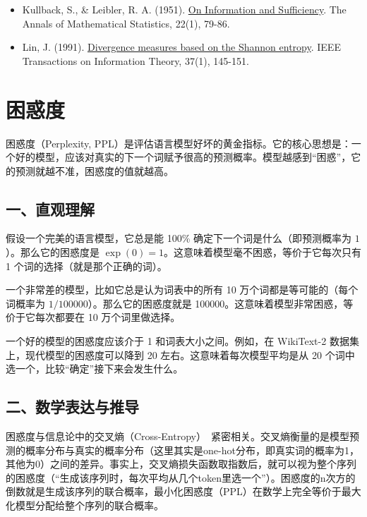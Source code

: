 \vspace{0.25em}
\begin{itemize}
\tightlist
\item
  Kullback, S., \& Leibler, R. A. (1951). \href{https://doi.org/10.1214/aoms/1177729694}{On Information and Sufficiency}. The Annals of Mathematical Statistics, 22(1), 79-86.
\item
  Lin, J. (1991). \href{https://doi.org/10.1109/18.61115}{Divergence measures based on the Shannon entropy}. IEEE Transactions on Information Theory, 37(1), 145-151.
\end{itemize}

\clearpage

\hypertarget{ux56f0ux60d1ux5ea6}{%
\section{困惑度}\label{ux56f0ux60d1ux5ea6}}

困惑度（Perplexity, PPL）是评估语言模型好坏的黄金指标。它的核心思想是：一个好的模型，应该对真实的下一个词赋予很高的预测概率。模型越感到``困惑''，它的预测就越不准，困惑度的值就越高。

\hypertarget{ux4e00ux76f4ux89c2ux7406ux89e3}{%
\subsection{一、直观理解}\label{ux4e00ux76f4ux89c2ux7406ux89e3}}

假设一个完美的语言模型，它总是能 100\% 确定下一个词是什么（即预测概率为 \(1\)）。那么它的困惑度是 \(\exp(0)=1\)。这意味着模型毫不困惑，等价于它每次只有 1 个词的选择（就是那个正确的词）。

一个非常差的模型，比如它总是认为词表中的所有 10 万个词都是等可能的（每个词概率为 \(1/100000\)）。那么它的困惑度就是 100000。这意味着模型非常困惑，等价于它每次都要在 10 万个词里做选择。

一个好的模型的困惑度应该介于 1 和词表大小之间。例如，在 WikiText-2 数据集上，现代模型的困惑度可以降到 20 左右。这意味着每次模型平均是从 20 个词中选一个，比较``确定''接下来会发生什么。

\hypertarget{ux4e8cux6570ux5b66ux8868ux8fbeux4e0eux63a8ux5bfc}{%
\subsection{二、数学表达与推导}\label{ux4e8cux6570ux5b66ux8868ux8fbeux4e0eux63a8ux5bfc}}

困惑度与信息论中的交叉熵（Cross-Entropy）~紧密相关。交叉熵衡量的是模型预测的概率分布与真实的概率分布（这里其实是one-hot分布，即真实词的概率为1，其他为0）之间的差异。事实上，交叉熵损失函数取指数后，就可以视为整个序列的困惑度（``生成该序列时，每次平均从几个token里选一个''）。困惑度的n次方的倒数就是生成该序列的联合概率，最小化困惑度（PPL）在数学上完全等价于最大化模型分配给整个序列的联合概率。

